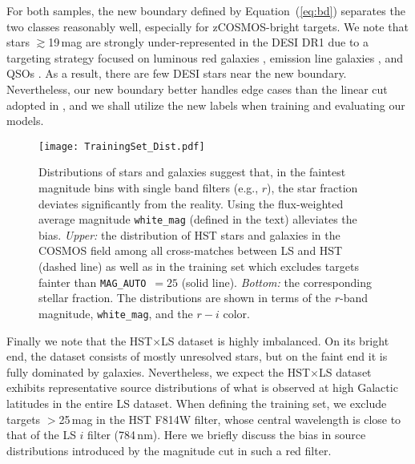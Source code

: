 \documentclass[twocolumn,tighten]{aastex631}
\newcommand{\magauto}{\texttt{MAG\_AUTO}}
\newcommand{\dr}[1]{DR{#1}}
\begin{document}
\begin{CJK*}{UTF8}{gbsn}
For both samples, the new boundary defined by Equation~(\ref{eq:bd}) separates the two classes reasonably well, especially for zCOSMOS-bright targets. We note that stars $\gtrsim$19\,mag are strongly under-represented in the DESI \dr{1} due to a targeting strategy focused on luminous red galaxies \citep[LRGs;][]{DESI_LRG_2023}, emission line galaxies \citep[ELGs;][]{DESI_ELG_2023}, and QSOs \citep{DESI_QSO_2023}. As a result, there are few DESI stars near the new boundary. Nevertheless, our new boundary better handles edge cases than the linear cut adopted in \cite{Leauthaud_2007}, and we shall utilize the new labels when training and evaluating our models.

\begin{figure*}
    \centering
    \texttt{[image: TrainingSet\_Dist.pdf]}
    \caption{Distributions of stars and galaxies suggest that, in the faintest magnitude bins with single band filters (e.g., $r$), the star fraction deviates significantly from the reality. Using the flux-weighted average magnitude \texttt{white\_mag} (defined in the text) alleviates the bias.
    {\it Upper:} the distribution of HST stars and galaxies in the COSMOS field among all cross-matches between LS and HST (dashed line) as well as in the training set which excludes targets fainter than \magauto\ $=25$ (solid line). {\it Bottom:} the corresponding stellar fraction. The distributions are shown in terms of the $r$-band magnitude, \texttt{white\_mag}, and the $r-i$ color.}
    \label{fig:bias}
\end{figure*}

Finally we note that the HST$\times$LS dataset is highly imbalanced. On its bright end, the dataset consists of mostly unresolved stars, but on the faint end it is fully dominated by galaxies. Nevertheless, we expect the HST$\times$LS dataset exhibits representative source distributions of what is observed at high Galactic latitudes in the entire LS dataset. When defining the training set, we exclude targets $>$25\,mag in the HST F814W filter, whose central wavelength is close to that of the LS $i$ filter (784\,nm). Here we briefly discuss the bias in source distributions introduced by the magnitude cut in such a red filter. 


\end{CJK*}
\end{document}
